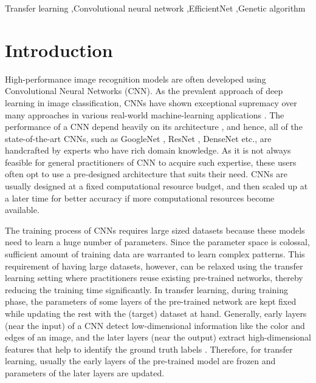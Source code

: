 \documentclass[a4paper,fleqn]{cas-sc}
\begin{document}
\begin{keywords}
Transfer learning \sep Convolutional neural network \sep EfficientNet \sep Genetic algorithm
\end{keywords}


\maketitle

\section{Introduction}
High-performance image recognition models are often developed using Convolutional Neural Networks (CNN). As the prevalent approach of deep learning %
in image classification, CNNs have shown exceptional supremacy over many approaches in various real-world machine-learning applications \cite{Krizhevsky2012}. The performance of a CNN depend heavily on its architecture \cite{ShimonyanZisserman2015}, and hence, all of the state-of-the-art CNNs, such as GoogleNet \cite{Szegedy2015}, ResNet \cite{HeZhang2016}, DenseNet \cite{HuangLiu2017} etc., are handcrafted by experts who have rich domain knowledge. As it is not always feasible for general practitioners of CNN to acquire such expertise, these users often opt to use a pre-designed architecture that suits their need. CNNs are usually designed at a fixed computational resource budget, and then scaled up at a later time for better accuracy if more computational resources become available.

The training process of CNNs requires large sized datasets because these models need to learn a huge number of parameters. Since the parameter space is colossal, sufficient amount of training data are warranted to learn complex patterns. This requirement of having large datasets, however, can be relaxed using the transfer learning setting \cite{PanYang2010} where practitioners reuse existing pre-trained networks, thereby reducing the training time significantly. In transfer learning, during training phase, the parameters of some layers of the pre-trained network are kept fixed while updating the rest with the (target) dataset at hand. %
Generally, early layers (near the input) of a CNN detect low-dimensional information like the color and edges of an image, and the later layers (near the output) extract high-dimensional features that help to identify the ground truth labels \cite{ZeilerFergus2014}. Therefore,  for transfer learning, usually the early layers of the pre-trained model are frozen and parameters of the later layers are updated.
\end{document}
